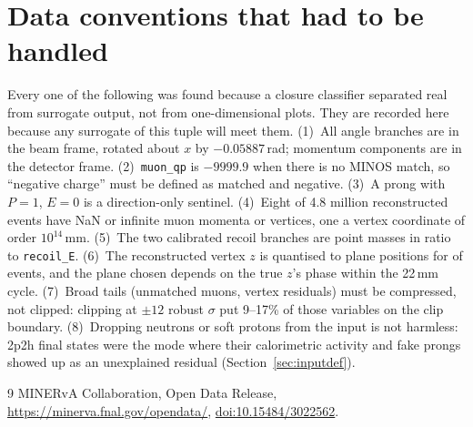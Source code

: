 \documentclass[11pt]{article}
\begin{document}
\appendix
\section{Data conventions that had to be handled}
\label{app:conv}

Every one of the following was found because a closure classifier separated real from surrogate output, not
from one-dimensional plots. They are recorded here because any surrogate of this tuple will meet them.
(1)~All angle branches are in the beam frame, rotated about $x$ by $-0.05887$\,rad; momentum components are in
the detector frame. (2)~\texttt{muon\_qp} is $-9999.9$ when there is no MINOS match, so ``negative charge'' must be
defined as matched and negative. (3)~A prong with $P=1$, $E=0$ is a direction-only sentinel. (4)~Eight of 4.8
million reconstructed events have NaN or infinite muon momenta or vertices, one a vertex coordinate of order
$10^{14}$\,mm. (5)~The two calibrated recoil branches are point masses in ratio to \texttt{recoil\_E}. (6)~The
reconstructed vertex $z$ is quantised to plane positions for \nSnapReal{} of events, and the plane chosen depends on the
true $z$'s phase within the 22\,mm cycle. (7)~Broad tails (unmatched muons, vertex residuals) must be compressed,
not clipped: clipping at $\pm 12$ robust $\sigma$ put 9--17\% of those variables on the clip boundary. (8)~Dropping
neutrons or soft protons from the input is not harmless: 2p2h final states were the mode where their
calorimetric activity and fake prongs showed up as an unexplained residual (Section~\ref{sec:inputdef}).

\begin{thebibliography}{9}
 MINERvA Collaboration, Open Data Release, \url{https://minerva.fnal.gov/opendata/},
\href{https://doi.org/10.15484/3022562}{doi:10.15484/3022562}.
\end{thebibliography}
\end{document}
